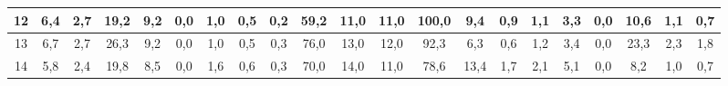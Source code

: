 \begin{sidewaystable}[]
\begin{tabular}{|c|c|c|c|c|c|c|c|c|c|c|c|c|c|c|c|c|c|c|c|c|}
    12 & 6,4                                              & 2,7                                              & 19,2                                             & 9,2                                              & 0,0                                              & 1,0                                              & 0,5                                              & 0,2                                              & 59,2                                            & 11,0                                            & 11,0                                            & 100,0                                           & 9,4                                             & 0,9                                             & 1,1                                             & 3,3                                             & 0,0                                             & 10,6                                             & 1,1                                              &  0,7                                               \\ \hline
    13 & 6,7                                              & 2,7                                              & 26,3                                             & 9,2                                              & 0,0                                              & 1,0                                              & 0,5                                              & 0,3                                              & 76,0                                            & 13,0                                            & 12,0                                            & 92,3                                            & 6,3                                             & 0,6                                             & 1,2                                             & 3,4                                             & 0,0                                             & 23,3                                             & 2,3                                              &  1,8                                               \\ \hline
    14 & 5,8                                              & 2,4                                              & 19,8                                             & 8,5                                              & 0,0                                              & 1,6                                              & 0,6                                              & 0,3                                              & 70,0                                            & 14,0                                            & 11,0                                            & 78,6                                            & 13,4                                            & 1,7                                             & 2,1                                             & 5,1                                             & 0,0                                             & 8,2                                              & 1,0                                              &  0,7                                               \\ \hline

\end{tabular}
\end{sidewaystable}
